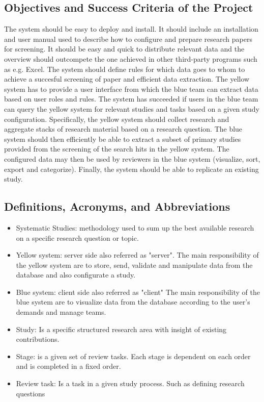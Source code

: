 \subsection{Objectives and Success Criteria of the Project}
The system should be easy to deploy and install. It should include an installation and user manual used to describe how to configure and prepare research papers for screening. It should be easy and quick to distribute relevant data and the overview should outcompete the one achieved in other third-party programs such as e.g. Excel. The system should define rules for which data goes to whom to achieve a succesful screening of paper and efficient data extraction. The yellow system has to provide a user interface from which the blue team can extract data based on user roles and rules. The system has succeeded if users in the blue team can query the yellow system for relevant studies and tasks based on a given study configuration. Specifically, the yellow system should collect research and aggregate stacks of research material based on a research question. The blue system should then efficiently be able to extract a subset of primary studies provided from the screening of the search hits in the yellow system. The configured data may then be used by reviewers in the blue system (visualize, sort, export and categorize). Finally, the system should be able to replicate an existing study.

\subsection{Definitions, Acronyms, and Abbreviations}

	\begin{itemize}
	  \item Systematic Studies: methodology used to sum up the best available research on a specific research question or topic.  
	  \item Yellow system: server side also referred as "server". The main responsibility of the yellow system are to store, send, validate and manipulate data from the database and also configurate a study.
	  \item Blue system: client side also referred as "client" The main responsibility of the blue system are to visualize data from the database according to the user's demands and manage teams.
	  \item Study: Is a specific structured research area with insight of existing contributions.
	  \item Stage: is a given set of review tasks. Each stage is dependent on each order and is completed in a fixed order.
	  \item Review task: Is a task in a given study process. Such as defining research questions
	  
	\end{itemize}
	
